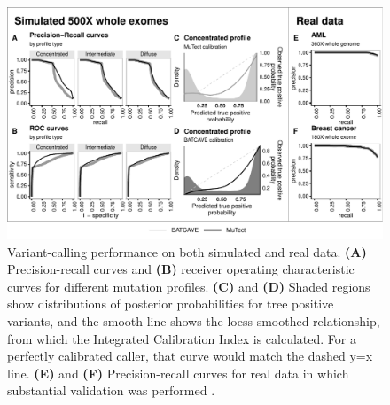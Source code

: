 \documentclass[a4,center,fleqn]{NAR}
\begin{document}

  \begin{figure}
    \begin{center}
    \includegraphics[width=\textwidth]{figures/fig_wes.pdf}
    \end{center}
    \caption{Variant-calling performance on both simulated and real data.
    \textbf{(A)} Precision-recall curves and \textbf{(B)} receiver operating characteristic curves for different mutation profiles.
    \textbf{(C)} and \textbf{(D)} Shaded regions show distributions of posterior probabilities for tree positive variants, and the smooth line shows the loess-smoothed relationship, from which the Integrated Calibration Index is calculated. For a perfectly calibrated caller, that curve would match the dashed y=x line. 
    \textbf{(E)} and \textbf{(F)} Precision-recall curves for real data in which substantial validation was performed \cite{Griffith2015,Shi2018}.
}
  \label{NAR-wes_fig}
  \end{figure}
  
\end{document}
